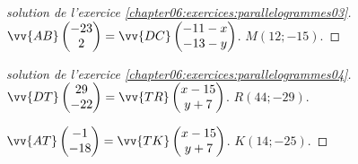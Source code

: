 \begin{proof}[solution de l'exercice  \ref{chapter06:exercices:parallelogrammes03}]   
	
	$\vv{AB}\begin{pmatrix}
		-23\\ 2 
	\end{pmatrix} =\vv{DC}\begin{pmatrix}
		-11-x\\ -13-y
	\end{pmatrix}$. $M(12;-15)$.
\end{proof}
\begin{proof}[solution de l'exercice  \ref{chapter06:exercices:parallelogrammes04}]   
	
	$\vv{DT}\begin{pmatrix}
		29\\ -22 
	\end{pmatrix} =\vv{TR}\begin{pmatrix}
		x-15\\ y+7
	\end{pmatrix}$. $R(44;-29)$.
	
	$\vv{AT}\begin{pmatrix}
		-1\\ -18 
	\end{pmatrix} =\vv{TK}\begin{pmatrix}
		x-15\\ y+7
	\end{pmatrix}$. $K(14;-25)$.
\end{proof}
